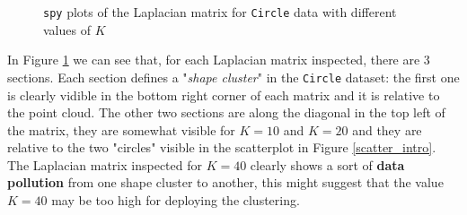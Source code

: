 \begin{figure}[H]
    \caption{\texttt{spy} plots of the Laplacian matrix for \texttt{Circle} data with different values of \(K\)}
    \label{LaplacianSpy_circle}
  \end{figure}
  In Figure \ref{LaplacianSpy_circle} we can see that, for each Laplacian matrix inspected, there are 3 sections. Each section defines a "\textit{shape cluster}" in the \texttt{Circle} dataset: the first one is clearly vidible in the bottom right corner of each matrix and it is relative to the point cloud. The other two sections are along the diagonal in the top left of the matrix, they are somewhat visible for \(K= 10\) and \(K= 20\) and they are relative to the two "circles" visible in the scatterplot in Figure \ref{scatter_intro}. The Laplacian matrix inspected for \(K= 40\) clearly shows a sort of \textbf{data pollution} from one shape cluster to another, this might suggest that the value \(K= 40\) may be too high for deploying the clustering.
